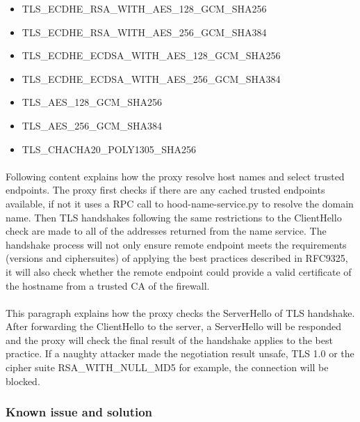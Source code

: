 \documentclass[mscthesis]{usiinfthesis}
\begin{document}
\begin{itemlist}[H]
  \begin{itemize}
    \item TLS\_ECDHE\_RSA\_WITH\_AES\_128\_GCM\_SHA256
    \item TLS\_ECDHE\_RSA\_WITH\_AES\_256\_GCM\_SHA384
    \item TLS\_ECDHE\_ECDSA\_WITH\_AES\_128\_GCM\_SHA256
    \item TLS\_ECDHE\_ECDSA\_WITH\_AES\_256\_GCM\_SHA384
    \item TLS\_AES\_128\_GCM\_SHA256
    \item TLS\_AES\_256\_GCM\_SHA384
    \item TLS\_CHACHA20\_POLY1305\_SHA256
  \end{itemize}
  \label{lst:tls-ciphersuites}
\end{itemlist}

\paragraph{}
Following content explains how the proxy resolve host names and select trusted endpoints. The proxy first checks if there are any cached trusted endpoints available, if not it uses a RPC call to hood-name-service.py to resolve the domain name. Then TLS handshakes following the same restrictions to the ClientHello check are made to all of the addresses returned from the name service. The handshake process will not only ensure remote endpoint meets the requirements (versions and ciphersuites) of applying the best practices described in RFC9325, it will also check whether the remote endpoint could provide a valid certificate of the hostname from a trusted CA of the firewall.
\paragraph{}
This paragraph explains how the proxy checks the ServerHello of TLS handshake. After forwarding the ClientHello to the server, a ServerHello will be responded and the proxy will check the final result of the handshake applies to the best practice. If a naughty attacker made the negotiation result unsafe, TLS 1.0 or the cipher suite RSA\_WITH\_NULL\_MD5 for example, the connection will be blocked.

\subsubsection{Known issue and solution}
\end{document}

